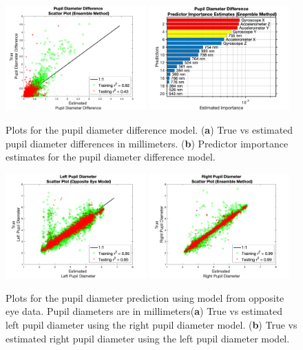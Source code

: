 \documentclass[10pt]{article}
\begin{document}
\begin{figure}[!t]
  \centering
  \includegraphics[width=0.48\textwidth]{./scatterPlots/PupilDiameterDifference_Ensemble_Scatter2.png}\label{fig:PDDa}
  \hfill
  \includegraphics[width=0.48\textwidth]{./importanceRankings/PupilDiameterDifferenceEnsembleImpRankT20.png}\label{fig:PDDb}
  \caption{Plots for the pupil diameter difference model. (\textbf{a}) True vs estimated pupil diameter differences in millimeters. (\textbf{b}) Predictor importance estimates for the pupil diameter difference model.
  }
  \label{fig:PDD}
\end{figure}

\begin{figure}[!t]
  \centering
  \includegraphics[width=0.48\textwidth]{./scatterPlots/LeftPupilDiameter_Ensemble_oppMdl_Scatter2.png}\label{fig:OPMa}
  \hfill
  \includegraphics[width=0.48\textwidth]{./scatterPlots/RightPupilDiameter_Ensemble_Scatter2.png}\label{fig:OPMb}
  \caption{Plots for the pupil diameter prediction using model from opposite eye data. Pupil diameters are in millimeters(\textbf{a}) True vs estimated left pupil diameter using the right pupil diameter model. (\textbf{b}) True vs estimated right pupil diameter using the left pupil diameter model.
  }
  \label{fig:OPM}
\end{figure}
\end{document}
